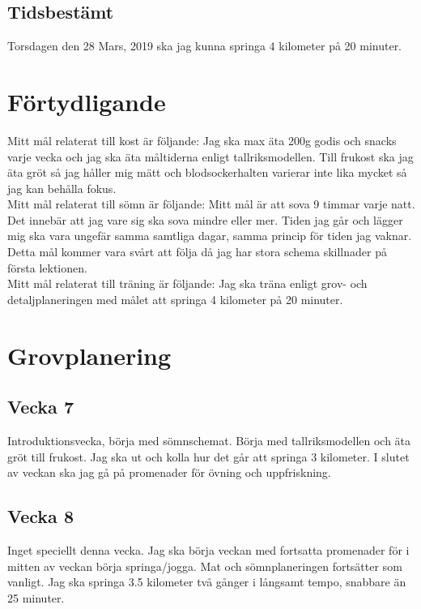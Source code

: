 \documentclass{article}
\begin{document}
\subsection{Tidsbestämt}
Torsdagen den 28 Mars, 2019 ska jag kunna springa 4 kilometer på 20 minuter.\\

\section{Förtydligande}
	Mitt mål relaterat till kost är följande: Jag ska max äta 200g godis och snacks varje vecka och jag ska äta måltiderna enligt tallriksmodellen. Till frukost ska jag äta gröt så jag håller mig mätt och blodsockerhalten varierar inte lika mycket så jag kan behålla fokus. \\

	Mitt mål relaterat till sömn är följande: Mitt mål är att sova 9 timmar varje natt. Det innebär att jag vare sig ska sova mindre eller mer. Tiden jag går och lägger mig ska vara ungefär samma samtliga dagar, samma princip för tiden jag vaknar. Detta mål kommer vara svårt att följa då jag har stora schema skillnader på första lektionen. \\

	Mitt mål relaterat till träning är följande: Jag ska träna enligt grov- och detaljplaneringen med målet att springa 4 kilometer på 20 minuter.

\section{Grovplanering}

\subsection{Vecka 7}
	Introduktionsvecka, börja med sömnschemat. Börja med tallriksmodellen och äta gröt till frukost. Jag ska ut och kolla hur det går att springa 3 kilometer. I slutet av veckan ska jag gå på promenader för övning och uppfriskning. 

\subsection{Vecka 8}
	Inget speciellt denna vecka. Jag ska börja veckan med fortsatta promenader för i mitten av veckan börja springa/jogga. Mat och sömnplaneringen fortsätter som vanligt. Jag ska springa 3.5 kilometer två gånger i långsamt tempo, snabbare än 25 minuter.
\end{document}
